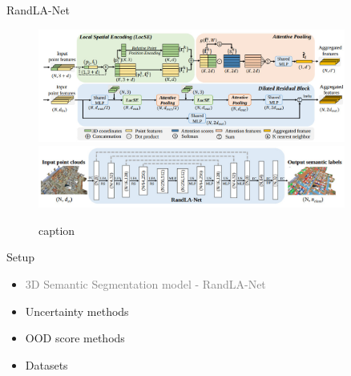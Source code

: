 \documentclass[aspectratio=169]{beamer}
\begin{document}
\begin{frame}{RandLA-Net}
    \begin{figure}
        \centering
        \includegraphics[width = 0.9\textwidth, height=0.37\textheight]{images/randlanet_dires_block.jpg}
        \includegraphics[width = 0.9\textwidth, height=0.37\textheight]{images/randlanet_model.jpg}
        \caption{caption}
        \label{fig:randla_model}
    \end{figure}
\end{frame}
\begin{frame}[noframenumbering]{Setup}
    \begin{itemize}
        
        \item \textcolor{gray}{3D Semantic Segmentation model - RandLA-Net}
        \item Uncertainty methods
        \item OOD score methods
        \item Datasets
    \end{itemize}
\end{frame}
\end{document}
